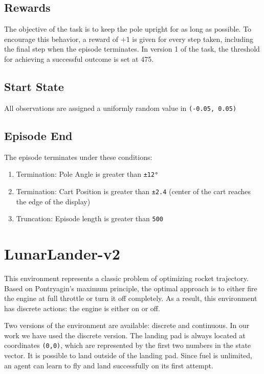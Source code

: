 \documentclass{article} %
\begin{document}
\subsection{Rewards}

The objective of the task is to keep the pole upright for as long as possible. To encourage
this behavior, a reward of +1 is given for every step taken, including the final step when
the episode terminates. In version 1 of the task, the threshold for achieving a successful
outcome is set at 475.

\subsection{Start State}
All observations are assigned a uniformly random value in \verb|(-0.05, 0.05)|

\subsection{Episode End}
The episode terminates under these conditions:

\begin{enumerate}
    \item Termination: Pole Angle is greater than \verb|±12°|
    \item Termination: Cart Position is greater than \verb|±2.4| (center of the cart
    reaches the edge of the display)
    \item Truncation: Episode length is greater than \verb|500|
\end{enumerate}


\section{LunarLander-v2}

This environment represents a classic problem of optimizing rocket trajectory. Based on Pontryagin’s maximum principle, the optimal approach is to either fire the engine at full throttle or turn it off completely. As a result, this environment has discrete actions: the engine is either on or off.

Two versions of the environment are available: discrete and continuous. In our work we have used the discrete version. The landing pad is always located at coordinates \verb|(0,0)|, which are represented by the first two numbers in the state vector. It is possible to land outside of the landing pad. Since fuel is unlimited, an agent can learn to fly and land successfully on its first attempt.
\end{document}
